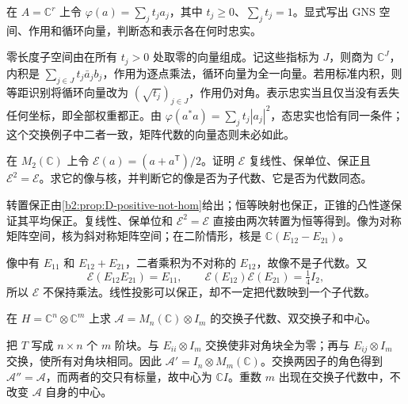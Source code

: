\begin{exercise}\label{b2:ex:D-finite-gns}
	在 \(A=\mathbb C^r\) 上令 \(\varphi(a)=\sum_j t_j a_j\)，其中 \(t_j\ge0\)、\(\sum_jt_j=1\)。显式写出 GNS 空间、作用和循环向量，判断态和表示各在何时忠实。
\end{exercise}
\begin{solution}
	零长度子空间由在所有 \(t_j>0\) 处取零的向量组成。记这些指标为 \(J\)，则商为 \(\mathbb C^J\)，内积是 \(\sum_{j\in J}t_j\bar a_j b_j\)，作用为逐点乘法，循环向量为全一向量。若用标准内积，则等距识别将循环向量改为 \((\sqrt{t_j})_{j\in J}\)，作用仍对角。表示忠实当且仅当没有丢失任何坐标，即全部权重都正。由 \(\varphi(a^*a)=\sum_jt_j|a_j|^2\)，态忠实也恰有同一条件；这个交换例子中二者一致，矩阵代数的向量态则未必如此。
\end{solution}

\begin{exercise}\label{b2:ex:D-positive-not-hom}
	在 \(M_2(\mathbb C)\) 上令 \(\mathcal E(a)=(a+a^{\mathsf T})/2\)。证明 \(\mathcal E\) 复线性、保单位、保正且 \(\mathcal E^2=\mathcal E\)。求它的像与核，并判断它的像是否为子代数、它是否为代数同态。
\end{exercise}
\begin{solution}
	转置保正由\cref{b2:prop:D-positive-not-hom}给出；恒等映射也保正，正锥的凸性遂保证其平均保正。复线性、保单位和 \(\mathcal E^2=\mathcal E\) 直接由两次转置为恒等得到。像为对称矩阵空间，核为斜对称矩阵空间；在二阶情形，核是 \(\mathbb C(E_{12}-E_{21})\)。

	像中有 \(E_{11}\) 和 \(E_{12}+E_{21}\)，二者乘积为不对称的 \(E_{12}\)，故像不是子代数。又
	\[
		\mathcal E(E_{12}E_{21})=E_{11},\qquad \mathcal E(E_{12})\mathcal E(E_{21})=\tfrac14 I_2,
	\]
	所以 \(\mathcal E\) 不保持乘法。线性投影可以保正，却不一定把代数映到一个子代数。
\end{solution}

\begin{exercise}\label{b2:ex:D-multiplicity-commutant}
	在 \(H=\mathbb C^n\otimes\mathbb C^m\) 上求 \(\mathcal A=M_n(\mathbb C)\otimes I_m\) 的交换子代数、双交换子和中心。
\end{exercise}
\begin{solution}
	把 \(T\) 写成 \(n\times n\) 个 \(m\) 阶块。与 \(E_{ii}\otimes I_m\) 交换使非对角块全为零；再与 \(E_{ij}\otimes I_m\) 交换，使所有对角块相同。因此 \(\mathcal A'=I_n\otimes M_m(\mathbb C)\)。交换两因子的角色得到 \(\mathcal A''=\mathcal A\)，而两者的交只有标量，故中心为 \(\mathbb CI\)。重数 \(m\) 出现在交换子代数中，不改变 \(\mathcal A\) 自身的中心。
\end{solution}

